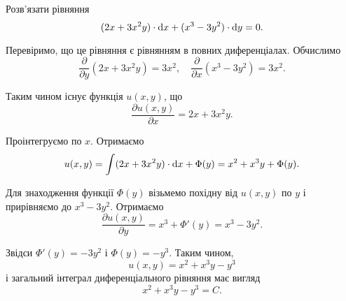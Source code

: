 \begin{example}
	Розв’язати рівняння \[(2x + 3x^2y) \cdot \mathop{}\!\mathrm{d} x + (x^3 - 3y^2) \cdot \mathop{}\!\mathrm{d} y = 0.\]
\end{example}
\begin{solution}
	Перевіримо, що це рівняння є рівнянням в повних диференціалах. Обчислимо \[ \frac{\partial}{\partial y} (2x + 3x^2y) = 3x^2, \quad \frac{\partial}{\partial x} (x^3 - 3y^2) = 3x^2. \]
	
	Таким чином існує функція $u(x,y)$, що \[\frac{\partial u(x,y)}{\partial x} = 2x + 3x^2y.\] 
	
	Проінтегруємо по $x$. Отримаємо \[ u(x,y) = \int(2x+3x^2y)\cdot\mathop{}\!\mathrm{d} x+\Phi(y)=x^2+x^3y+\Phi(y).\]
	
	Для знаходження функції $\Phi(y)$ візьмемо похідну від $u(x,y)$ по $y$ і прирівняємо до $x^3-3y^2$. Отримаємо \[ \frac{\partial u(x,y)}{\partial y} = x^3 + \Phi'(y) = x^3 - 3y^2.\]

	Звідси $\Phi'(y) = -3y^2$ і $\Phi(y) = -y^3$. Таким чином, \[u(x,y)=x^2+x^3y-y^3\] і загальний інтеграл диференціального рівняння має вигляд \[x^2+x^3y-y^3=C.\]
\end{solution}

